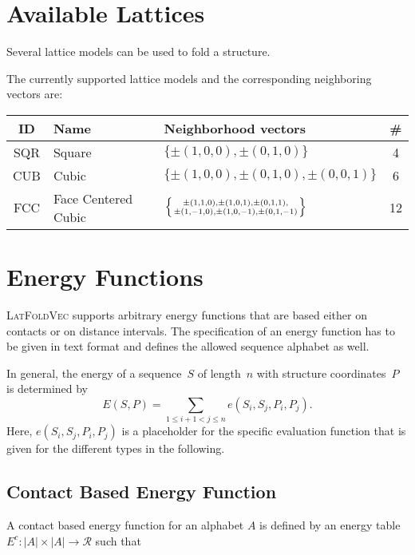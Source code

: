 \documentclass{article}
\newcommand{\latFoldVec}{\textsc{LatFoldVec}}
\begin{document}
\section{Available Lattices}
\label{sec:lat}

Several lattice models can be used to fold a structure. 

\vspace{0.5em}
The currently supported lattice models and the corresponding neighboring
vectors are:

\vspace{0.5em}
\begin{tabular}{c|l|l|c}
	ID & Name & Neighborhood vectors & \#\\
	\hline
	SQR & Square & $\{\pm(1,0,0),\pm(0,1,0)\}$ & 4\\
	CUB & Cubic & $\{\pm(1,0,0),\pm(0,1,0),\pm(0,0,1)\}$ & 6\\
	FCC & Face Centered Cubic & 
	$\left\{\pm(1,1,0),\pm(1,0,1),\pm(0,1,1), \atop
	\pm(1,-1,0),\pm(1,0,-1),\pm(0,1,-1)\right\}$ & 12 
\end{tabular}



\section{Energy Functions}
\label{sec:energy}

\latFoldVec{} supports arbitrary energy functions that are based either on contacts
or on distance intervals. The specification of an energy function has to be
given in text format and defines the allowed sequence alphabet as well.

In general, the energy of a sequence~$S$ of length~$n$ with structure
coordinates~$P$ is determined by
\begin{equation}
	E(S,P) = \sum_{1\leq i+1<j\leq n} e(S_i, S_j, P_i, P_j).
\end{equation}
Here, $e(S_i, S_j, P_i, P_j)$ is a placeholder for the specific evaluation
function that is given for the different types in the following.

\subsection{Contact Based Energy Function}
\label{sec:energy:contact}

A contact based energy function for an alphabet $A$ is defined by an energy
table $E^c : |A|\times|A| \rightarrow \mathcal{R}$ such that 
\end{document}
